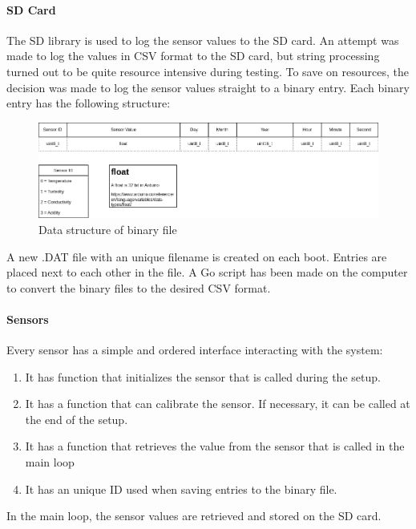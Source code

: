 \paragraph{SD Card} \label{sd}

The SD library is used to log the sensor values to the \gls{SD} card. An attempt was made to log the values in \gls{CSV} format to the \gls{SD} card, but string processing turned out to be quite resource intensive during testing. To save on resources, the decision was made to log the sensor values straight to a binary entry. Each binary entry has the following structure:

\begin{figure}[h]
\centering
\includegraphics[scale=0.45]{070_design/software/61_datastructure.png}
\caption{Data structure of binary file}
\end{figure}

A new .DAT file with an unique filename is created on each boot. Entries are placed next to each other in the file. A Go \cite{golang} script has been made on the computer to convert the binary files to the desired \gls{CSV} format. \cite{dat2csv}

\paragraph{Sensors}

Every sensor has a simple and ordered interface interacting with the system:
\begin{enumerate}
  \item It has function that initializes the sensor that is called during the setup.
  \item It has a function that can calibrate the sensor. If necessary, it can be called at the end of the setup.
  \item It has a function that retrieves the value from the sensor that is called in the main loop
  \item It has an unique ID used when saving entries to the binary file.
\end{enumerate}

In the main loop, the sensor values are retrieved and stored on the \gls{SD} card.
\newpage
